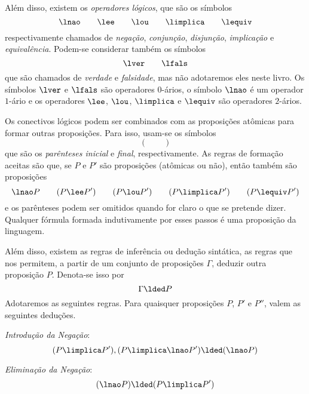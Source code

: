 Além disso, existem os \emph{operadores lógicos}, que são os símbolos
	\begin{equation*}
	\lnao \qquad \lee \qquad \lou \qquad \limplica \qquad \lequiv
	\end{equation*}
respectivamente chamados de \emph{negação}, \emph{conjunção}, \emph{disjunção}, \emph{implicação} e \emph{equivalência}. Podem-se considerar também os símbolos
	\begin{equation*}
	\lver \qquad \lfals
	\end{equation*}
que são chamados de \emph{verdade} e \emph{falsidade}, mas não adotaremos eles neste livro. Os símbolos $\lver$ e $\lfals$ são operadores $0$-ários, o símbolo $\lnao$ é um operador $1$-ário e os operadores $\lee$, $\lou$, $\limplica$ e $\lequiv$ são operadores $2$-ários.

Os conectivos lógicos podem ser combinados com as proposições atômicas para formar outras proposições. Para isso, usam-se os símbolos
	\begin{equation*}
	( \qquad )
	\end{equation*}
que são os \emph{parênteses inicial} e \emph{final}, respectivamente. As regras de formação aceitas são que, se $P$ e $P'$ são proposições (atômicas ou não), então também são proposições
	\begin{equation*}
	\lnao P \qquad (P \lee P') \qquad (P \lou P') \qquad (P \limplica P') \qquad (P \lequiv P')
	\end{equation*}
e os parênteses podem ser omitidos quando for claro o que se pretende dizer. Qualquer fórmula formada indutivamente por esses passos é uma proposição da linguagem.

Além disso, existem as regras de inferência ou dedução sintática, as regras que nos permitem, a partir de um conjunto de proposições $\Gamma$, deduzir outra proposição $P$. Denota-se isso por
	\begin{equation*}
	\Gamma \lded P
	\end{equation*}
Adotaremos as seguintes regras. Para quaisquer proposições $P$, $P'$ e $P''$, valem as seguintes deduções.

\emph{Introdução da Negação}:
	\begin{equation*}
	(P \limplica P'), (P \limplica \lnao P') \lded (\lnao P)
	\end{equation*}

\emph{Eliminação da Negação}:
	\begin{equation*}
	(\lnao P) \lded (P \limplica P')
	\end{equation*}

